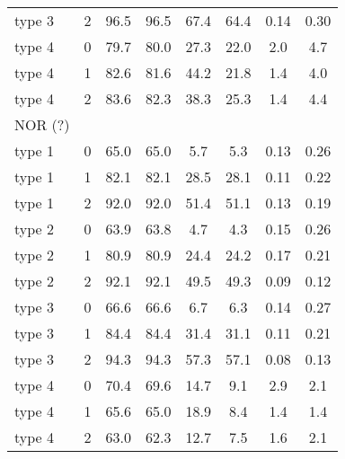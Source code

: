 \documentclass[
]{article}
\begin{document}
\begin{longtable}{lccccccc}
type 3 & 2 & 96.5 & 96.5 & 67.4 & 64.4 & 0.14 & 0.30 \\ 
type 4 & 0 & 79.7 & 80.0 & 27.3 & 22.0 & 2.0 & 4.7 \\ 
type 4 & 1 & 82.6 & 81.6 & 44.2 & 21.8 & 1.4 & 4.0 \\ 
type 4 & 2 & 83.6 & 82.3 & 38.3 & 25.3 & 1.4 & 4.4 \\ 
\midrule
\multicolumn{1}{l}{NOR (?)} \\ 
\midrule
type 1 & 0 & 65.0 & 65.0 & 5.7 & 5.3 & 0.13 & 0.26 \\ 
type 1 & 1 & 82.1 & 82.1 & 28.5 & 28.1 & 0.11 & 0.22 \\ 
type 1 & 2 & 92.0 & 92.0 & 51.4 & 51.1 & 0.13 & 0.19 \\ 
type 2 & 0 & 63.9 & 63.8 & 4.7 & 4.3 & 0.15 & 0.26 \\ 
type 2 & 1 & 80.9 & 80.9 & 24.4 & 24.2 & 0.17 & 0.21 \\ 
type 2 & 2 & 92.1 & 92.1 & 49.5 & 49.3 & 0.09 & 0.12 \\ 
type 3 & 0 & 66.6 & 66.6 & 6.7 & 6.3 & 0.14 & 0.27 \\ 
type 3 & 1 & 84.4 & 84.4 & 31.4 & 31.1 & 0.11 & 0.21 \\ 
type 3 & 2 & 94.3 & 94.3 & 57.3 & 57.1 & 0.08 & 0.13 \\ 
type 4 & 0 & 70.4 & 69.6 & 14.7 & 9.1 & 2.9 & 2.1 \\ 
type 4 & 1 & 65.6 & 65.0 & 18.9 & 8.4 & 1.4 & 1.4 \\ 
type 4 & 2 & 63.0 & 62.3 & 12.7 & 7.5 & 1.6 & 2.1 \\ 
\bottomrule
\end{longtable}
\end{document}
